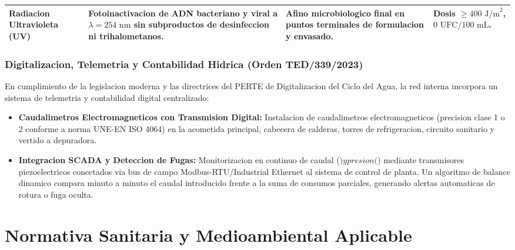 \documentclass{report}
\begin{document}
\begin{table}[H]
\begin{tabularx}{\textwidth}{@{}lXp{4.2cm}l@{}}
        \addlinespace

        \textbf{Radiacion Ultravioleta (UV)} & Fotoinactivacion de ADN bacteriano y viral a $\lambda = 254\text{ nm}$ sin subproductos de desinfeccion ni trihalometanos. & Afino microbiologico final en puntos terminales de formulacion y envasado. & Dosis $\ge 400\text{ J/m}^2$, $0\text{ UFC/100 mL}$. \\

        \bottomrule

    \end{tabularx}

\end{table}



\subsection{Digitalizacion, Telemetria y Contabilidad Hidrica (Orden TED/339/2023)}

En cumplimiento de la legislacion moderna y las directrices del PERTE de Digitalizacion del Ciclo del Agua, la red interna incorpora un sistema de telemetria y contabilidad digital centralizado:

\begin{itemize}

    \item \textbf{Caudalimetros Electromagneticos con Transmision Digital:} Instalacion de caudalimetros electromagneticos (precision clase 1 o 2 conforme a norma UNE-EN ISO 4064) en la acometida principal, cabecera de calderas, torres de refrigeracion, circuito sanitario y vertido a depuradora.

    \item \textbf{Integracion SCADA y Deteccion de Fugas:} Monitorizacion en continuo de caudal ($) y presion ($) mediante transmisores piezoelectricos conectados via bus de campo Modbus-RTU/Industrial Ethernet al sistema de control de planta. Un algoritmo de balance dinamico compara minuto a minuto el caudal introducido frente a la suma de consumos parciales, generando alertas automaticas de rotura o fuga oculta.

\end{itemize}





\chapter{Normativa Sanitaria y Medioambiental Aplicable}
\end{document}

